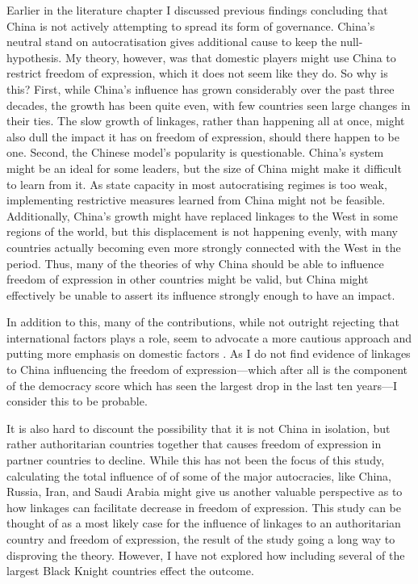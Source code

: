 Earlier in the literature chapter I discussed previous findings concluding that China is not actively attempting to spread its form of governance. China's neutral stand on autocratisation gives additional cause to keep the null-hypothesis. My theory, however, was that domestic players might use China to restrict freedom of expression, which it does not seem like they do. So why is this? First, while China's influence has grown considerably over the past three decades, the growth has been quite even, with few countries seen large changes in their ties. The slow growth of linkages, rather than happening all at once, might also dull the impact it has on freedom of expression, should there happen to be one. Second, the Chinese model's popularity is questionable. China's system might be an ideal for some leaders, but the size of China might make it difficult to learn from it. As state capacity in most autocratising regimes is too weak, implementing restrictive measures learned from China might not be feasible. Additionally, China's growth might have replaced linkages to the West in some regions of the world, but this displacement is not happening evenly, with many countries actually becoming even more strongly connected with the West in the period. Thus, many of the theories of why China should be able to influence freedom of expression in other countries might be valid, but China might effectively be unable to assert its influence strongly enough to have an impact.

In addition to this, many of the contributions, while not outright rejecting that international factors plays a role, seem to advocate a more cautious approach and putting more emphasis on domestic factors \citep{bader_china_2015, buzogany_illiberal_2017, risse_democracy_2015}. As I do not find evidence of linkages to China influencing the freedom of expression---which after all is the component of the democracy score which has seen the largest drop in the last ten years---I consider this to be probable. 

It is also hard to discount the possibility that it is not China in isolation, but rather authoritarian countries together that causes freedom of expression in partner countries to decline. While this has not been the focus of this study, calculating the total influence of of some of the major autocracies, like China, Russia, Iran, and Saudi Arabia might give us another valuable perspective as to how linkages can facilitate decrease in freedom of expression. This study can be thought of as a most likely case for the influence of linkages to an authoritarian country and freedom of expression, the result of the study going a long way to disproving the theory. However, I have not explored how including several of the largest Black Knight countries effect the outcome. 


